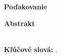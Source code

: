 \ifdefined\podakovanie
	\newpage
	\null
	\vfill
	{\noindent\large\bf Poďakovanie} 
	\vspace{1.5cm}
	
	\podakovanie
	\vspace{1cm}
\fi
\thispagestyle{empty}

\newpage
{\noindent\large\bf Abstrakt}
\vspace{1cm}

\noindent \abstraktPoSlovensky \\

{\noindent \textbf{Kľúčové slová:} \emph{\klucoveSlovaPoSlovensky}.} 
\thispagestyle{empty}

 



\newpage
{}
\tableofcontents
\thispagestyle{empty}
\newpage{}
